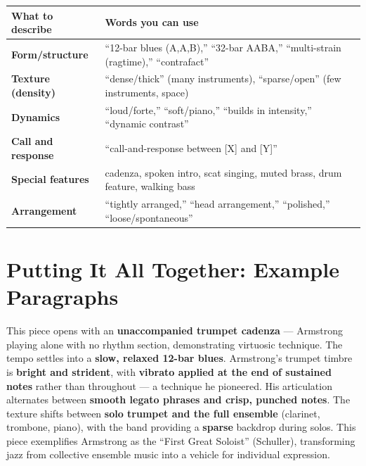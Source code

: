 \documentclass[11pt,letterpaper]{article}
\begin{document}
\begin{small}
\begin{tabularx}{\textwidth}{>{\bfseries}p{3cm} X}
\toprule
\textbf{What to describe} & \textbf{Words you can use} \\
\midrule
Form/structure & ``12-bar blues (A,A,B),'' ``32-bar AABA,'' ``multi-strain (ragtime),'' ``contrafact'' \\
Texture (density) & ``dense/thick'' (many instruments), ``sparse/open'' (few instruments, space) \\
Dynamics & ``loud/forte,'' ``soft/piano,'' ``builds in intensity,'' ``dynamic contrast'' \\
Call and response & ``call-and-response between [X] and [Y]'' \\
Special features & cadenza, spoken intro, scat singing, muted brass, drum feature, walking bass \\
Arrangement & ``tightly arranged,'' ``head arrangement,'' ``polished,'' ``loose/spontaneous'' \\
\bottomrule
\end{tabularx}
\end{small}

\section{Putting It All Together: Example Paragraphs}

\begin{tcolorbox}[examplebox, title={Example: Louis Armstrong --- ``West End Blues'' (1928)}]
This piece opens with an \textbf{unaccompanied trumpet cadenza} --- Armstrong playing alone with no rhythm section, demonstrating virtuosic technique. The tempo settles into a \textbf{slow, relaxed 12-bar blues}. Armstrong's trumpet timbre is \textbf{bright and strident}, with \textbf{vibrato applied at the end of sustained notes} rather than throughout --- a technique he pioneered. His articulation alternates between \textbf{smooth legato phrases and crisp, punched notes}. The texture shifts between \textbf{solo trumpet and the full ensemble} (clarinet, trombone, piano), with the band providing a \textbf{sparse} backdrop during solos. This piece exemplifies Armstrong as the ``First Great Soloist'' (Schuller), transforming jazz from collective ensemble music into a vehicle for individual expression.
\end{tcolorbox}
\end{document}
